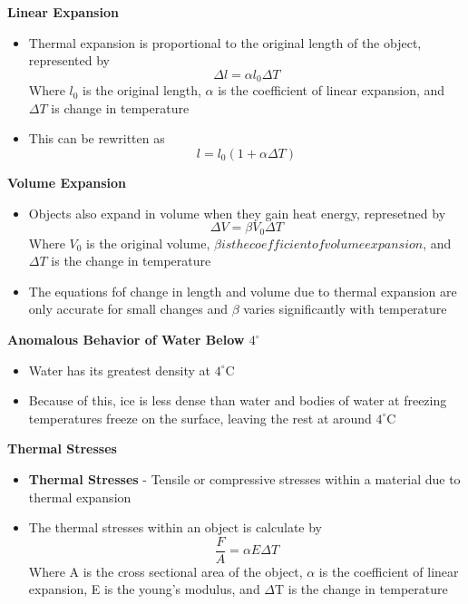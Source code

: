 \textbf{Linear Expansion}
\begin{itemize}
    \item Thermal expansion is proportional to the original length of the object, represented by \[\Delta l=\alpha l_0\Delta T\] Where \(l_0\) is the original length, \(\alpha\) is the coefficient of linear expansion, and \(\Delta T\) is change in temperature
    \item This can be rewritten as \[l=l_0(1+\alpha\Delta T)\]
\end{itemize}

\textbf{Volume Expansion}
\begin{itemize}
    \item Objects also expand in volume when they gain heat energy, represetned by \[\Delta V=\beta V_0\Delta T\] Where \(V_0\) is the original volume, \(\beta is the coefficient of volume expansion\), and \(\Delta T\) is the change in temperature
    \item The equations fof change in length and volume due to thermal expansion are only accurate for small changes and \(\beta\) varies significantly with temperature
\end{itemize}

\textbf{Anomalous Behavior of Water Below
\(4^\circ\)}
\begin{itemize}
    \item Water has its greatest density at \(4^\circ\)C 
    \item Because of this, ice is less dense than water and bodies of water at freezing temperatures freeze on the surface, leaving the rest at around \(4^\circ\)C
\end{itemize}

\textbf{Thermal Stresses}
\begin{itemize}
    \item \textbf{Thermal Stresses} - Tensile or compressive stresses within a material due to thermal expansion
    \item The thermal stresses within an object is calculate by \[\frac{F}{A}=\alpha E\Delta T\] Where A is the cross sectional area of the object, \(\alpha\) is the coefficient of linear expansion, E is the young's modulus, and \(\Delta\)T is the change in temperature
\end{itemize}

